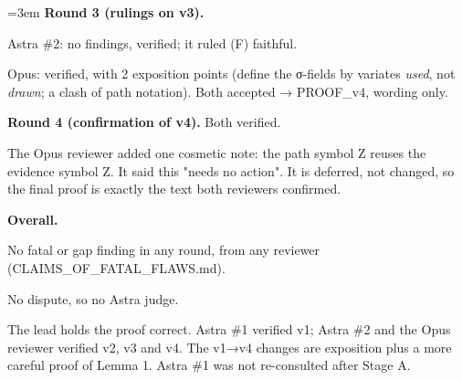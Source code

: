 \documentclass[11pt]{report}
\newenvironment{mdblock}{\begingroup\mdfont\raggedright\setlength{\parindent}{0pt}\setlength{\parskip}{0.55em}\emergencystretch=3em}{\par\endgroup}
\begin{document}
\begin{mdblock}
\textbf{Round 3 (rulings on v3).}

\begin{mdbul}
\item Astra \#2: no findings, verified; it ruled (F) faithful.
\item Opus: verified, with 2 exposition points (define the σ-fields by variates \emph{used}, not \emph{drawn}; a clash of path notation). Both accepted → PROOF\_v4, wording only.
\end{mdbul}

\textbf{Round 4 (confirmation of v4).} Both verified.

\begin{mdbul}
\item The Opus reviewer added one cosmetic note: the path symbol Z reuses the evidence symbol Z. It said this "needs no action". It is deferred, not changed, so the final proof is exactly the text both reviewers confirmed.
\end{mdbul}

\textbf{Overall.}

\begin{mdbul}
\item No fatal or gap finding in any round, from any reviewer (CLAIMS\_OF\_FATAL\_FLAWS.md).
\item No dispute, so no Astra judge.
\item The lead holds the proof correct. Astra \#1 verified v1; Astra \#2 and the Opus reviewer verified v2, v3 and v4. The v1→v4 changes are exposition plus a more careful proof of Lemma 1. Astra \#1 was not re-consulted after Stage A.
\end{mdbul}
\end{mdblock}
\end{document}
